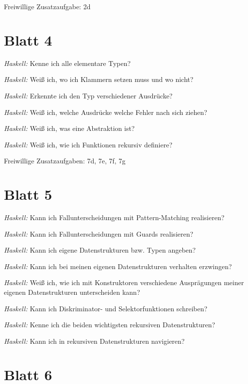 \documentclass{article}
\newcommand*{\thecheckbox}{\hss[\hss]}
\newenvironment*{checklist} 
{\list{}{\itemsep -2pt 
\renewcommand*{\makelabel}[1]{\thecheckbox}}} 
{\endlist}
\begin{document}
Freiwillige Zusatzaufgabe: 2d

\section{Blatt 4}

\begin{checklist}
  \item \emph{Haskell:} Kenne ich alle elementare Typen?
  \item \emph{Haskell:} Weiß ich, wo ich Klammern setzen muss und wo nicht?
  \item \emph{Haskell:} Erkennte ich den Typ verschiedener Ausdrücke?
  \item \emph{Haskell:} Weiß ich, welche Ausdrücke welche Fehler nach sich ziehen?
  \item \emph{Haskell:} Weiß ich, was eine Abstraktion ist?
  \item \emph{Haskell:} Weiß ich, wie ich Funktionen rekursiv definiere?
\end{checklist}

Freiwillige Zusatzaufgaben: 7d, 7e, 7f, 7g

\section{Blatt 5}

\begin{checklist}
  \item \emph{Haskell:} Kann ich Fallunterscheidungen mit Pattern-Matching realisieren?
  \item \emph{Haskell:} Kann ich Fallunterscheidungen mit Guards realisieren?
  \item \emph{Haskell:} Kann ich eigene Datenstrukturen bzw. Typen angeben?
  \item \emph{Haskell:} Kann ich bei meinen eigenen Datenstrukturen verhalten erzwingen?
  \item \emph{Haskell:} Weiß ich, wie ich mit Konstruktoren verschiedene Ausprägungen meiner eigenen Datenstrukturen unterscheiden kann?
  \item \emph{Haskell:} Kann ich Diskriminator- und Selektorfunktionen schreiben?
  \item \emph{Haskell:} Kenne ich die beiden wichtigsten rekursiven Datenstrukturen?
  \item \emph{Haskell:} Kann ich in rekursiven Datenstrukturen navigieren?
\end{checklist}

\section{Blatt 6}
\end{document}
